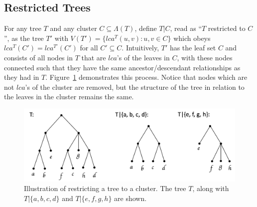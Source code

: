 \documentclass[final,1p,times]{elsarticle}
\newcommand{\compatible}{\smile}
\newcommand{\leafset}{\Lambda}
\newtheorem{lemma}[theorem]{Lemma}
\begin{document}
    \subsection{Restricted Trees}
    \label{subsec:restrictedtree}

    For any tree $T$ and any cluster $C \subseteq \leafset(T)$, define $T|C$, read as ``$T$ restricted to $C$'', as the tree $T'$ with $V(T') = \{lca^T(u, v) : u, v \in C\}$ which obeys $lca^T(C') = lca^{T'}(C')$ for all $C' \subseteq C$. Intuitively, $T'$ has the leaf set $C$ and consists of all nodes in $T$ that are $lca$'s of the leaves in $C$, with these nodes connected such that they have the same ancestor/descendant relationships as they had in $T$. Figure~\ref{fig:restrictedtree} demonstrates this process. Notice that nodes which are not $lca$'s of the cluster are removed, but the structure of the tree in relation to the leaves in the cluster remains the same.

    \begin{figure}[ht]
        \includegraphics[scale=0.5]{restrictedsubtree}
        \centering
        \caption[Restricted Trees]{Illustration of restricting a tree to a cluster. The tree $T$, along with $T|\{a, b, c, d\}$ and $T|\{e, f, g, h\}$ are shown.}
        \label{fig:restrictedtree}
    \end{figure}

%
%
\end{document}
